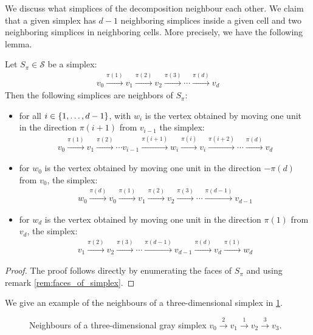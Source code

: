 We discuss what simplices of the decomposition neighbour each other. We claim that a given simplex has $d-1$ neighboring simplices inside a given cell and two neighboring simplices in neighboring cells. More precisely, we have the following lemma.

\begin{lemma}
	Let $S_{\pi} \in \mathcal{S}$ be a simplex:
	\begin{align*}
		v_0 \xrightarrow{\pi(1)} v_1 \xrightarrow{\pi(2)} v_2 \xrightarrow{\pi(3)} \cdots \xrightarrow{\pi(d)} v_d
	\end{align*}
	Then the following simplices are neighbors of $S_{\pi}$:
	\begin{itemize}
		\item for all $i \in \left\{1, \dots, d-1\right\}$, with $w_i$ is the vertex obtained by moving one unit in the direction $\pi(i+1)$ from $v_{i-1}$ the simplex:
		      \begin{align*}
			      v_0 \xrightarrow{\pi(1)} v_1 \xrightarrow{\pi(2)} \cdots v_{i-1} \xrightarrow{\pi(i+1)} w_i \xrightarrow{\pi(i)} v_{i} \xrightarrow{\pi(i+2)} \cdots \xrightarrow{\pi(d)} v_d
		      \end{align*}
		\item for $w_0$ is the vertex obtained by moving one unit in the direction $-\pi(d)$ from $v_{0}$, the simplex:
		      \begin{align*}
			      w_0 \xrightarrow{\pi(d)} v_0 \xrightarrow{\pi(1)} v_1 \xrightarrow{\pi(2)} v_2 \xrightarrow{\pi(3)} \cdots \xrightarrow{\pi(d-1)} v_{d-1}
		      \end{align*}
		\item for $w_d$ is the vertex obtained by moving one unit in the direction $\pi(1)$ from $v_{d}$, the simplex:
		      \begin{align*}
			      v_1 \xrightarrow{\pi(2)} v_2 \xrightarrow{\pi(3)} \cdots \xrightarrow{\pi(d-1)} v_{d-1} \xrightarrow{\pi(d)} v_d \xrightarrow{\pi(1)} w_d
		      \end{align*}
	\end{itemize}
\end{lemma}
\begin{proof}
	The proof follows directly by enumerating the faces of $S_{\pi}$ and using remark \cref{rem:faces_of_simplex}.
\end{proof}
We give an example of the neighbours of a three-dimensional simplex in \cref{fig:neighbours_of_simplex}.

\begin{figure}
	\centering
	{\large{}}
	\caption[Neighbours of a Simplex]{Neighbours of a three-dimensional gray simplex ${v_0 \xrightarrow{2} v_1 \xrightarrow{1} v_2 \xrightarrow{3} v_3} $.}\label{fig:neighbours_of_simplex}
\end{figure}

